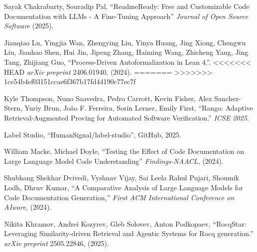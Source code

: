 \documentclass[11pt,a4paper]{article}
\begin{document}
\begin{thebibliography}{9}
    Sayak Chakrabarty, Souradip Pal,
    ``ReadmeReady: Free and Customizable Code Documentation with LLMs - A Fine-Tuning Approach''
    \emph{Journal of Open Source Software} (2025).

    Jianqiao Lu, Yingjia Wan, Zhengying Liu, Yinya Huang, Jing Xiong, Chengwu Liu, Jianhao Shen, Hui Jin, Jipeng Zhang, Haiming Wang, Zhicheng Yang, Jing Tang, Zhijiang Guo,
    ``Process-Driven Autoformalization in Lean 4.''.
<<<<<<< HEAD
    \emph{arXiv preprint} 2406.01940, (2024).
=======
>>>>>>> 1ce54b4ef03151ccae6f367b17fd44190c77ec7f

    Kyle Thompson, Nuno Saavedra, Pedro Carrott, Kevin Fisher, Alex Sanchez-Stern, Yuriy Brun, João F. Ferreira, Sorin Lerner, Emily First,
    ``Rango: Adaptive Retrieval-Augmented Proving for Automated Software Verification.''
    \emph{ICSE 2025}.

    Label Studio, “HumanSignal/label-studio”, GitHub, 2025.

    William Macke, Michael Doyle,
    ``Testing the Effect of Code Documentation on Large Language Model Code Understanding''
    \emph{Findings-NAACL}, (2024).

    Shubhang Shekhar Dvivedi, Vyshnav Vijay, Sai Leela Rahul Pujari, Shoumik Lodh, Dhruv Kumar,
    ``A Comparative Analysis of Large Language Models for Code Documentation Generation,''
    \emph{First ACM International Conference on AIware}, (2024).

    Nikita Khramov, Andrei Kozyrev, Gleb Solovev, Anton Podkopaev,
    ``RocqStar: Leveraging Similarity-driven Retrieval and Agentic Systems for Rocq generation.''
    \emph{arXiv preprint} 2505.22846, (2025).

\end{thebibliography}
\end{document}

